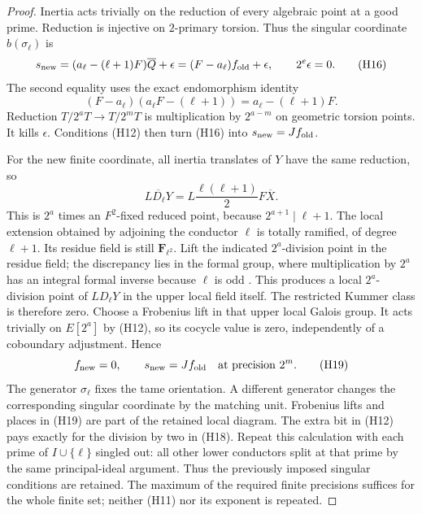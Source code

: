 \documentclass[11pt]{article}
\theoremstyle{definition}
\theoremstyle{remark}
\begin{document}
\begin{proof}
Inertia acts trivially on the reduction of every algebraic point
at a good prime. Reduction is injective on $2$-primary torsion.
Thus the singular coordinate $b(\sigma_\ell)$ is
\[
 s_{\rm new}=(a_\ell-(\ell+1)F)\overline Q+\epsilon
             =(F-a_\ell)f_{\rm old}+\epsilon,
                    \qquad 2^e\epsilon=0.              \tag{H16}
\]
The second equality uses the exact endomorphism identity
\[
 (F-a_\ell)(a_\ell F-(\ell+1))
                         =a_\ell-(\ell+1)F.            \tag{H17}
\]
Reduction $T/2^aT\to T/2^mT$ is multiplication by
$2^{a-m}$ on geometric torsion points. It kills $\epsilon$.
Conditions (H12) then turn (H16) into $s_{\rm new}=Jf_{\rm old}$.

For the new finite coordinate, all inertia translates of $Y$
have the same reduction, so
\[
 \overline{LD_\ell Y}
       =L\frac{\ell(\ell+1)}2F\overline X.              \tag{H18}
\]
This is $2^a$ times an $F^2$-fixed reduced point, because
$2^{a+1}\mid\ell+1$. The local extension obtained by adjoining
the conductor $\ell$ is totally ramified, of degree $\ell+1$.
Its residue field is still $\mathbf F_{\ell^2}$. Lift the indicated
$2^a$-division point in the residue field; the discrepancy lies
in the formal group, where multiplication by $2^a$ has an
integral formal inverse because $\ell$ is odd
\cite[IV.2.3 and IV.3.2, pp.~122--124]{silverman}. This produces a
local $2^a$-division point of $LD_\ell Y$ in the upper local
field itself. The restricted Kummer class is therefore zero.
Choose a Frobenius lift in that upper local Galois group.
It acts trivially on $E[2^a]$ by (H12), so its cocycle value is
zero, independently of a coboundary adjustment. Hence
\[
                     f_{\rm new}=0,\qquad
                     s_{\rm new}=Jf_{\rm old}
                  \quad\hbox{at precision }2^m.         \tag{H19}
\]
The generator $\sigma_\ell$ fixes the tame orientation. A different
generator changes the corresponding singular coordinate by the
matching unit. Frobenius lifts and places in (H19) are part of
the retained local diagram. The extra bit in (H12) pays exactly
for the division by two in (H18). Repeat this calculation with
each prime of $I\cup\{\ell\}$ singled out: all other lower
conductors split at that prime by the same principal-ideal argument.
Thus the previously imposed singular conditions are retained.
The maximum of the required finite precisions suffices for the
whole finite set; neither (H11) nor its exponent is repeated.


\end{proof}
\end{document}
